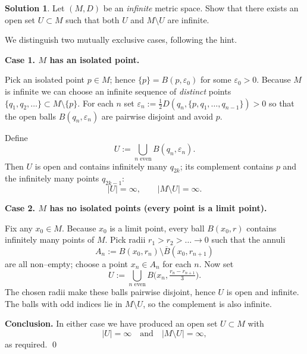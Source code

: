 \documentclass[12pt]{article}
\theoremstyle{definition} %
\newtheorem{solution}{Solution}
\theoremstyle{plain} %
\begin{document}

\begin{solution}
Let \((M,D)\) be an \emph{infinite} metric space.  
Show that there exists an open set \(U\subset M\) such that both
\(U\) and \(M\setminus U\) are infinite.

\bigskip

We distinguish two mutually exclusive cases, following the hint.

\medskip
\textbf{Case 1. \(M\) has an isolated point.}

Pick an isolated point \(p\in M\); hence
\(\{p\}=B(p,\varepsilon_{0})\) for some \(\varepsilon_{0}>0\).
Because \(M\) is infinite we can choose an infinite sequence of
\emph{distinct} points
\(
    \{q_{1},q_{2},\dots\}\subset M\setminus\{p\}.
\)
For each \(n\) set
\(
   \varepsilon_{n}:=\frac12D(q_{n},\{p,q_{1},\dots,q_{n-1}\})>0
\)
so that the open balls
\(B(q_{n},\varepsilon_{n})\) are pairwise disjoint and avoid \(p\).

Define
\[
   U:=\bigcup_{n\text{ even}} B(q_{n},\varepsilon_{n}).
\]
Then \(U\) is open and contains infinitely many \(q_{2k}\); its
complement contains \(p\) and the infinitely many points \(q_{2k-1}\):
\[
   |U|=\infty,\qquad |M\setminus U|=\infty.
\]

\medskip
\textbf{Case 2. \(M\) has no isolated points (every point is a
limit point).}

Fix any \(x_{0}\in M\).
Because \(x_{0}\) is a limit point, every ball \(B(x_{0},r)\) contains
infinitely many points of \(M\).
Pick radii \(r_{1}>r_{2}>\dots\to0\) such that the annuli
\[
   A_{n}:=B(x_{0},r_{n})\setminus\overline{B}(x_{0},r_{n+1})
\]
are all non–empty; choose a point \(x_{n}\in A_{n}\) for each \(n\).
Now set
\[
   U := \bigcup_{n\text{ even}} B\!\bigl(x_{n},\tfrac{r_{n}-r_{n+1}}{3}\bigr).
\]
The chosen radii make these balls pairwise disjoint, hence \(U\) is open
and infinite.
The balls with odd indices lie in \(M\setminus U\), so the complement is
also infinite.

\medskip
\textbf{Conclusion.}
In either case we have produced an open set \(U\subset M\) with
\[
   |U|=\infty
   \quad\text{and}\quad
   |M\setminus U|=\infty,
\]
as required.
\qed
\end{solution}
\end{document}
